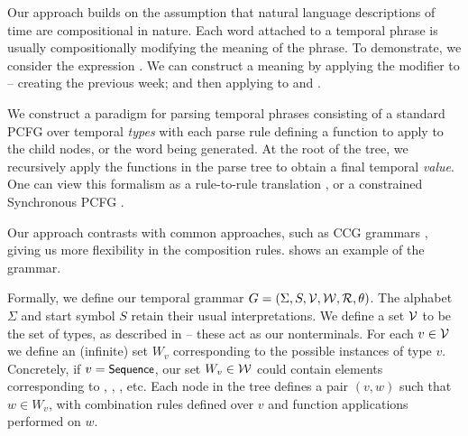 Our approach builds on the assumption that natural language descriptions
	of time are compositional in nature.
Each word attached to a temporal phrase is 
	usually compositionally modifying the meaning of the phrase.
To demonstrate, we consider the expression .
We can construct a meaning by 
	applying the modifier  to  -- 
	creating the previous week;
	and then applying  to  and .

We construct a paradigm for parsing temporal phrases 
	consisting of a standard PCFG over temporal \textit{types} with each parse 
	rule defining a function to apply to the child nodes, or the word being
	generated.
At the root of the tree, we recursively apply the functions in the parse tree
	to obtain a final temporal \textit{value}.
One can view this formalism as a rule-to-rule translation
	\cite[p.~263]{key:1976bach-semantics,key:1995allen-semantics},
	or a constrained Synchronous PCFG
	\cite{key:2001yamada-syntaxmt}.

Our approach contrasts with common approaches, such as CCG grammars 
	\cite{key:2000steedman-ccg,key:2004bos-ccg,2011kwiatkowski-semantics},
	giving us more flexibility in the composition rules.
 shows an example of the grammar.

Formally, we define our temporal grammar
	\mbox{$G=\left(\Sigma,S,\mathcal{V},\mathcal{W},\mathcal{R},\theta\right)$}.
The alphabet $\Sigma$ and start symbol $S$ retain their usual interpretations.
We define a set $\mathcal{V}$ to be the set of types, as described in
	 -- these act as our nonterminals.
For each $v \in \mathcal{V}$ we define an (infinite) set $W_v$ corresponding to the 
	possible instances of type $v$.
Concretely, if $v=\textsf{\small{Sequence}}$, our set $W_v \in \mathcal{W}$ could contain elements
	corresponding to , , , etc.
Each node in the tree defines a pair $(v,w)$ such that $w \in W_v$,
	with combination rules defined over $v$ and function applications performed
	on $w$.

